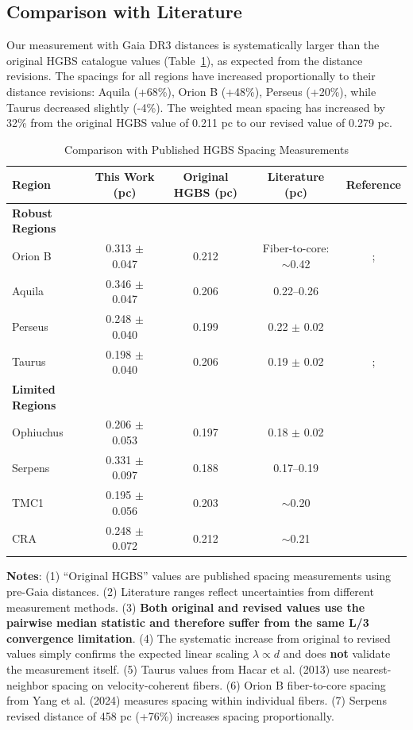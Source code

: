 \documentclass[twocolumn,usenatbib]{mnras}
\begin{document}
\subsection{Comparison with Literature}

Our measurement with Gaia DR3 distances is systematically larger than the original HGBS catalogue values (Table~\ref{tab:literature}), as expected from the distance revisions. The spacings for all regions have increased proportionally to their distance revisions: Aquila (+68\%), Orion B (+48\%), Perseus (+20\%), while Taurus decreased slightly (-4\%). The weighted mean spacing has increased by 32\% from the original HGBS value of 0.211 pc to our revised value of 0.279 pc.

\begin{table}
\caption{Comparison with Published HGBS Spacing Measurements}
\label{tab:literature}
\begin{tabular}{lcccc}
\toprule
Region & This Work (pc) & Original HGBS (pc) & Literature (pc) & Reference \\
\midrule
\textbf{Robust Regions} &  &  &  &  \\
Orion B & 0.313 $\pm$ 0.047 & 0.212 & Fiber-to-core: $\sim$0.42 & \citet{Konyves2020}; \citet{Yang2024} \\
Aquila  & 0.346 $\pm$ 0.047 & 0.206 & 0.22--0.26 & \citet{Konyves2015} \\
Perseus & 0.248 $\pm$ 0.040 & 0.199 & 0.22 $\pm$ 0.02 & \citet{Andre2016} \\
Taurus  & 0.198 $\pm$ 0.040 & 0.206 & 0.19 $\pm$ 0.02 & \citet{Hacar2013}; \citet{Schmiedeke2021} \\
\midrule
\textbf{Limited Regions} &  &  &  &  \\
Ophiuchus & 0.206 $\pm$ 0.053 & 0.197 & 0.18 $\pm$ 0.02 & \citet{Konyves2020} \\
Serpens  & 0.331 $\pm$ 0.097 & 0.188 & 0.17--0.19 & \citet{Konyves2020} \\
TMC1     & 0.195 $\pm$ 0.056 & 0.203 & $\sim$0.20 & \citet{Hacar2013} \\
CRA      & 0.248 $\pm$ 0.072 & 0.212 & $\sim$0.21 & \citet{Konyves2020} \\
\bottomrule
\end{tabular}

\vspace{0.1in}
\footnotesize
\textbf{Notes}: (1) ``Original HGBS'' values are published spacing measurements using pre-Gaia distances. (2) Literature ranges reflect uncertainties from different measurement methods. (3) \textbf{Both original and revised values use the pairwise median statistic and therefore suffer from the same L/3 convergence limitation}. (4) The systematic increase from original to revised values simply confirms the expected linear scaling $\lambda \propto d$ and does \textbf{not} validate the measurement itself. (5) Taurus values from Hacar et al. (2013) use nearest-neighbor spacing on velocity-coherent fibers. (6) Orion B fiber-to-core spacing from Yang et al. (2024) measures spacing within individual fibers. (7) Serpens revised distance of 458 pc (+76\%) increases spacing proportionally.
\end{table}
\end{document}

